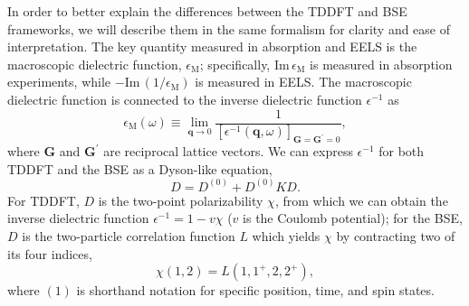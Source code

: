 \documentclass[aps,prb,10pt,showpacs,superscriptaddress,twocolumn,notitlepage]{revtex4-1}
\begin{document}
In order to better explain the differences between the TDDFT and BSE frameworks,
we will describe them in the same formalism for clarity and ease of
interpretation. The key quantity measured in absorption and EELS is the
macroscopic dielectric function, $\epsilon_{\mathrm{M}}$; specifically,
$\mathrm{Im}\,\epsilon_{\mathrm{M}}$ is measured in absorption experiments,
while $-\mathrm{Im}\,(1/\epsilon_{\mathrm{M}})$ is measured in EELS. The
macroscopic dielectric function is connected to the inverse dielectric function
$\epsilon^{-1}$ as
\begin{equation*}
\epsilon_{\mathrm{M}}(\omega)\equiv
\lim_{\mathbf{q}\to 0}
\frac{1}{[\epsilon^{-1}(\mathbf{q},\omega)]_{\mathbf{G = G^{\prime}} = 0}},
\end{equation*}
where $\mathbf{G}$ and $\mathbf{G^{\prime}}$ are reciprocal lattice vectors. We
can express $\epsilon^{-1}$ for both TDDFT and the BSE as a Dyson-like equation,
\begin{equation}\label{eq:dyson}
D = D^{(0)} + D^{(0)}KD.
\end{equation}
For TDDFT, $D$ is the two-point polarizability $\chi$, from which we can obtain
the inverse dielectric function $\epsilon^{-1} = 1 - v\chi$ ($v$ is the Coulomb
potential); for the BSE, $D$ is the two-particle correlation function $L$ which
yields $\chi$ by contracting two of its four indices,
\begin{equation}\label{eq:ki}
\chi(1, 2) = L(1, 1^{+}, 2, 2^{+}),
\end{equation}
where $(1)$ is shorthand notation for specific position, time, and spin states.
\end{document}
